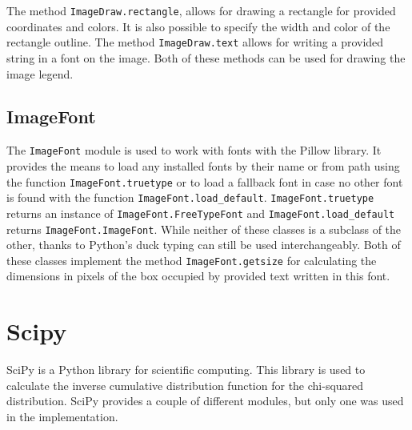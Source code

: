 \documentclass[
  digital, %
  color,   %
  oneside, %
  lof,     %
  nolot,     %
]{fithesis4}
\begin{document}
The method \texttt{ImageDraw.rectangle}, allows for drawing a rectangle for provided coordinates and colors.
It is also possible to specify the width and color of the rectangle outline.
The method \texttt{ImageDraw.text} allows for writing a provided string in a font on the image.
Both of these methods can be used for drawing the image legend.\cite{pillowimagedraw}

\subsection{ImageFont}
\label{ssec-imagefont}

The \texttt{ImageFont} module is used to work with fonts with the Pillow library.
It provides the means to load any installed fonts by their name or from path using the function \texttt{ImageFont.truetype} or to load a fallback font in case no other font is found with the function \texttt{ImageFont.load\_default}.
\texttt{ImageFont.truetype} returns an instance of \texttt{ImageFont.FreeTypeFont} and \texttt{ImageFont.load\_default} returns \texttt{ImageFont.ImageFont}.
While neither of these classes is a subclass of the other, thanks to Python's duck typing can still be used interchangeably.
Both of these classes implement the method \texttt{ImageFont.getsize} for calculating the dimensions in pixels of the box occupied by provided text written in this font.\cite{pillowimagefont}




\section{Scipy}
\label{sec:scipy}
SciPy\cite{scipy20} is a Python library for scientific computing.
This library is used to calculate the inverse cumulative distribution function for the chi-squared distribution.
SciPy provides a couple of different modules, but only one was used in the implementation.
\end{document}
